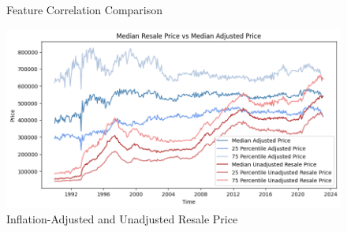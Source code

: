 \documentclass[[12pt,conference]{IEEEtran}
\begin{document}
\begin{figure}[H]
  \centering
  \hfill
  \caption{Feature Correlation Comparison}
  \label{Figure:FeatureCorrelationComparison}
\end{figure}

\begin{figure}[H]
    \centering
    \includegraphics[width=\linewidth]{image.png}
    \caption{Inflation-Adjusted and Unadjusted Resale Price}
    \label{fig:price_adjustment}
\end{figure}
\end{document}

